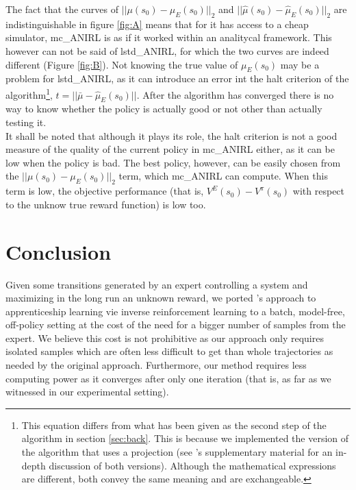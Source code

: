 \documentclass{article}
\begin{document}
The fact that  the curves of  $||\mu(s_0) - \mu_E(s_0)||_2$ and $||\hat\mu(s_0) - \hat\mu_E(s_0)||_2$ are indistinguishable in figure \ref{fig:A} means that for it has access to a cheap simulator, mc\_ANIRL is as if it worked within an analitycal framework. This however can not be said of lstd\_ANIRL, for which the two curves are indeed different (Figure \ref{fig:B}). Not knowing the true value of $\mu_E(s_0)$ may be a problem for lstd\_ANIRL, as it can introduce an error int the halt criterion of the algorithm\footnote{This equation differs from what has been given as the second step of the algorithm in section \ref{sec:back}. This is because we implemented the version of the algorithm that uses a projection (see \citet{abbeel2004apprenticeship}'s supplementary material for an in-depth discussion of both versions). Although the mathematical expressions are different, both convey the same meaning and are exchangeable.}, $t = ||\bar\mu-\hat\mu_E(s_0)||$. After the algorithm has converged there is no way to know whether the policy is actually good or not other than actually testing it.\\

It shall be noted that although it plays its role, the halt criterion is not a good measure of the quality of the current policy in mc\_ANIRL either, as it can be low when the policy is bad. The best policy, however, can be easily chosen from the $||\mu(s_0) - \mu_E(s_0)||_2$ term, which mc\_ANIRL can compute. When this term is low, the objective performance (that is, $V^E(s_0)-V^\pi(s_0)$ with respect to the unknow true reward function) is low too. 
\section{Conclusion}
\label{sec:conclusion}
Given some transitions generated by an expert controlling a system and maximizing in the long run an unknown reward, we ported \citet{abbeel2004apprenticeship}'s approach to apprenticeship learning vie inverse reinforcement learning to a batch, model-free, off-policy setting at the cost of the need for a bigger number of samples from the expert. We believe this cost is not prohibitive as our approach only requires isolated samples which are often less difficult to get than whole trajectories as needed by the original approach. Furthermore, our method requires less computing power as it converges after only one iteration (that is, as far as we witnessed in our experimental setting).\\
\end{document}
